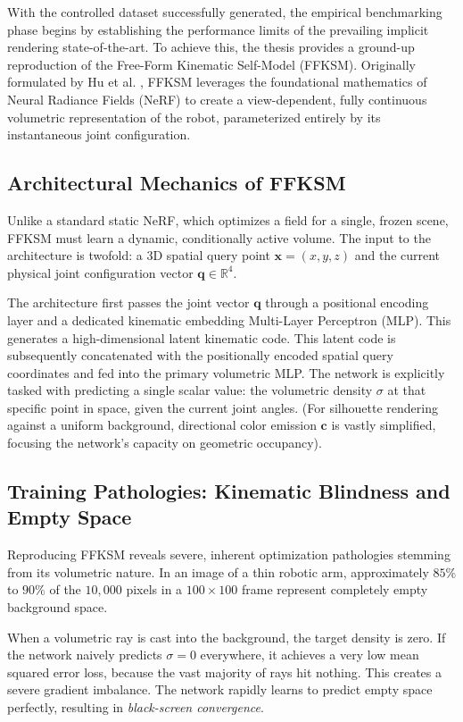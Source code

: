 \documentclass[12pt,a4paper,oneside]{report}
\begin{document}
With the controlled dataset successfully generated, the empirical benchmarking phase begins by establishing the performance limits of the prevailing implicit rendering state-of-the-art. To achieve this, the thesis provides a ground-up reproduction of the Free-Form Kinematic Self-Model (FFKSM). Originally formulated by Hu et al. \cite{hu2024teaching}, FFKSM leverages the foundational mathematics of Neural Radiance Fields (NeRF) to create a view-dependent, fully continuous volumetric representation of the robot, parameterized entirely by its instantaneous joint configuration.

\subsection{Architectural Mechanics of FFKSM}

Unlike a standard static NeRF, which optimizes a field for a single, frozen scene, FFKSM must learn a dynamic, conditionally active volume. The input to the architecture is twofold: a 3D spatial query point $\mathbf{x} = (x, y, z)$ and the current physical joint configuration vector $\mathbf{q} \in \mathbb{R}^4$. 

The architecture first passes the joint vector $\mathbf{q}$ through a positional encoding layer and a dedicated kinematic embedding Multi-Layer Perceptron (MLP). This generates a high-dimensional latent kinematic code. This latent code is subsequently concatenated with the positionally encoded spatial query coordinates and fed into the primary volumetric MLP. The network is explicitly tasked with predicting a single scalar value: the volumetric density $\sigma$ at that specific point in space, given the current joint angles. (For silhouette rendering against a uniform background, directional color emission $\mathbf{c}$ is vastly simplified, focusing the network's capacity on geometric occupancy).

\subsection{Training Pathologies: Kinematic Blindness and Empty Space}

Reproducing FFKSM reveals severe, inherent optimization pathologies stemming from its volumetric nature. In an image of a thin robotic arm, approximately $85\%$ to $90\%$ of the $10,000$ pixels in a $100 \times 100$ frame represent completely empty background space. 

When a volumetric ray is cast into the background, the target density is zero. If the network naively predicts $\sigma = 0$ everywhere, it achieves a very low mean squared error loss, because the vast majority of rays hit nothing. This creates a severe gradient imbalance. The network rapidly learns to predict empty space perfectly, resulting in \textit{black-screen convergence}. 
\end{document}
